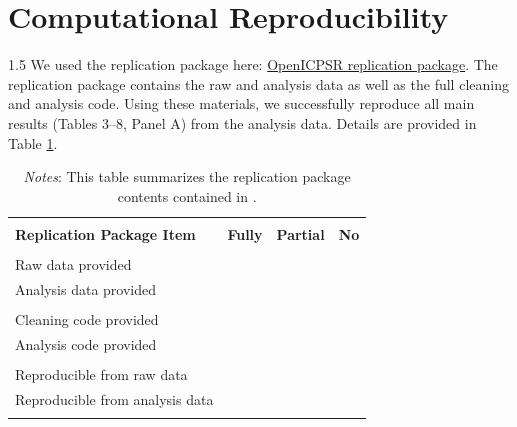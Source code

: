 \documentclass[12pt,a4paper]{article}
\begin{document}
	


\section{Computational Reproducibility}

\begin{spacing}{1.5}
We used the replication package here: \href{https://www.openicpsr.org/openicpsr/project/184946/version/V1/view}{OpenICPSR replication package}. 
The replication package contains the raw and analysis data as well as the full cleaning and analysis code. 
Using these materials, we successfully reproduce all main results (Tables 3–8, Panel A) from the analysis data. 
Details are provided in Table \ref{tab:reppkg_table}.

\begin{table}[h]
\centering
\caption{Replication Package Contents and Reproducibility}
\label{tab:reppkg_table}
\footnotesize 
	\begin{tabular}{lccc}
	\hline \hline
	\\
	\textbf{Replication Package Item} 	& \textbf{Fully} & \textbf{Partial} & \textbf{No} \\
	\hline
	\\
	Raw data provided                 	& \checkmark &  &  \\ 
	Analysis data provided				& \checkmark &  &  \\ 
	\\
	Cleaning code provided				&\checkmark  &  &  \\ 
	Analysis code provided				& \checkmark &  &  \\ 
	\\
	Reproducible from raw data			& \checkmark  &  &  \\ 
	Reproducible from analysis data		& \checkmark &  &  \\ 
	\\
	\hline \hline
	\end{tabular}
\caption*{
\footnotesize \emph{Notes}: This table summarizes the replication package contents contained in \cite{Cage}. %
}
\end{table}

\end{spacing}
\end{document}

